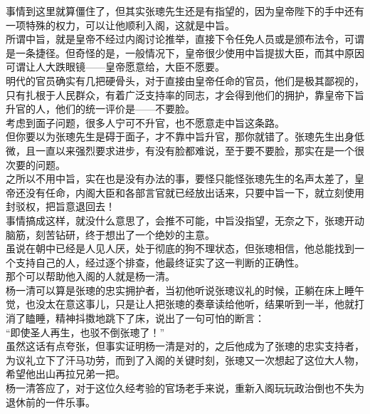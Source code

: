 \begin{multicols}{\theparacolNo}
事情到这里就算僵住了，但其实张璁先生还是有指望的，因为皇帝陛下的手中还有一项特殊的权力，可以让他顺利入阁，这就是中旨。\\

所谓中旨，就是皇帝不经过内阁讨论推举，直接下令任免人员或是颁布法令，可谓是一条捷径。但奇怪的是，一般情况下，皇帝很少使用中旨提拔大臣，而其中原因可谓让人大跌眼镜——皇帝愿意给，大臣不愿要。\\

明代的官员确实有几把硬骨头，对于直接由皇帝任命的官员，他们是极其鄙视的，只有扎根于人民群众，有着广泛支持率的同志，才会得到他们的拥护，靠皇帝下旨升官的人，他们的统一评价是——不要脸。\\

考虑到面子问题，很多人宁可不升官，也不愿意走中旨这条路。\\

但你要以为张璁先生是碍于面子，才不靠中旨升官，那你就错了。张璁先生出身低微，且一直以来强烈要求进步，有没有脸都难说，至于要不要脸，那实在是一个很次要的问题。\\

之所以不用中旨，实在也是没有办法的事，要怪只能怪张璁先生的名声太差了，皇帝还没有任命，内阁大臣和各部言官就已经放出话来，只要中旨一下，就立刻使用封驳权，把旨意退回去！\\

事情搞成这样，就没什么意思了，会推不可能，中旨没指望，无奈之下，张璁开动脑筋，刻苦钻研，终于想出了一个绝妙的主意。\\

虽说在朝中已经是人见人厌，处于彻底的狗不理状态，但张璁相信，他总能找到一个支持自己的人，经过逐个排查，他最终证实了这一判断的正确性。\\

那个可以帮助他入阁的人就是杨一清。\\

杨一清可以算是张璁的忠实拥护者，当初他听说张璁议礼的时候，正躺在床上睡午觉，也没太在意这事儿，只是让人把张璁的奏章读给他听，结果听到一半，他就打消了瞌睡，精神抖擞地跳下了床，说出了一句可怕的断言：\\

“即使圣人再生，也驳不倒张璁了！”\\

虽然这话有点夸张，但事实证明杨一清是对的，之后他成为了张璁的忠实支持者，为议礼立下了汗马功劳，而到了入阁的关键时刻，张璁又一次想起了这位大人物，希望他出山再拉兄弟一把。\\

杨一清答应了，对于这位久经考验的官场老手来说，重新入阁玩玩政治倒也不失为退休前的一件乐事。\\


\end{multicols}
